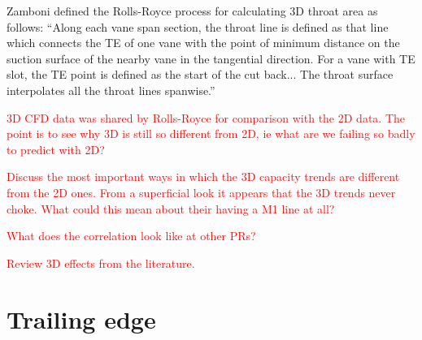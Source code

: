\documentclass[a4paper, 11pt, oneside]{report}
\begin{document}
Zamboni defined the Rolls-Royce process for calculating 3D throat area as follows: ``Along each vane span section, the throat line is defined as that line which connects the TE of one vane with the point of minimum distance on the suction surface of the nearby vane in the tangential direction. For a vane with TE slot, the TE point is defined as the start of the cut back... The throat surface interpolates all the throat lines spanwise.''

\textcolor{red}{3D CFD data was shared by Rolls-Royce for comparison with the 2D data. The point is to see why 3D is still so different from 2D, ie what are we failing so badly to predict with 2D?}

\textcolor{red}{Discuss the most important ways in which the 3D capacity trends are different from the 2D ones. From a superficial look it appears that the 3D trends never choke. What could this mean about their having a M1 line at all?}

\textcolor{red}{What does the correlation look like at other PRs?}

\textcolor{red}{Review 3D effects from the literature.}



\chapter{Trailing edge}
\label{chapter_trailing_edge}


\end{document}

